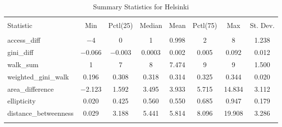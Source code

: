
\begin{table}[!htbp] \centering 
  \caption{Summary Statistics for Helsinki} 
  \label{} 
\begin{tabular}{@{\extracolsep{5pt}}lccccccc} 
\\[-1.8ex]\hline 
\hline \\[-1.8ex] 
Statistic & \multicolumn{1}{c}{Min} & \multicolumn{1}{c}{Pctl(25)} & \multicolumn{1}{c}{Median} & \multicolumn{1}{c}{Mean} & \multicolumn{1}{c}{Pctl(75)} & \multicolumn{1}{c}{Max} & \multicolumn{1}{c}{St. Dev.} \\ 
\hline \\[-1.8ex] 
access\_diff & $-$4 & 0 & 1 & 0.998 & 2 & 8 & 1.238 \\ 
gini\_diff & $-$0.066 & $-$0.003 & 0.0003 & 0.002 & 0.005 & 0.092 & 0.012 \\ 
walk\_sum & 1 & 7 & 8 & 7.474 & 9 & 9 & 1.500 \\ 
weighted\_gini\_walk & 0.196 & 0.308 & 0.318 & 0.314 & 0.325 & 0.344 & 0.020 \\ 
area\_difference & $-$2.123 & 1.592 & 3.495 & 3.933 & 5.715 & 14.834 & 3.112 \\ 
ellipticity & 0.020 & 0.425 & 0.560 & 0.550 & 0.685 & 0.947 & 0.179 \\ 
distance\_betweenness & 0.029 & 3.188 & 5.441 & 5.814 & 8.096 & 19.908 & 3.286 \\ 
\hline \\[-1.8ex] 
\end{tabular} 
\end{table} 
